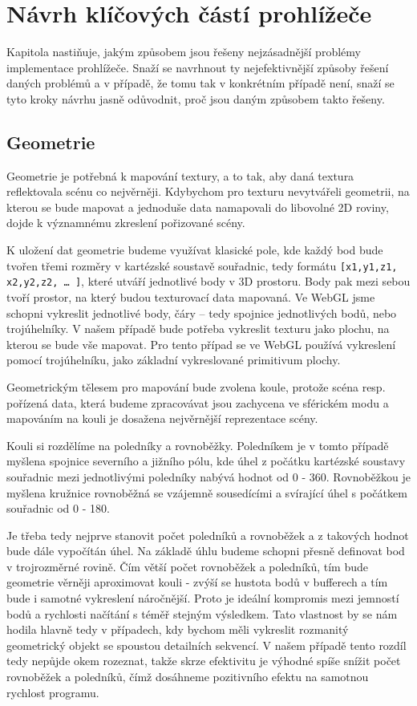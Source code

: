  



\newpage

\chapter{Návrh klíčových částí prohlížeče}
\label{chapter:3}
Kapitola nastiňuje, jakým způsobem jsou řešeny nejzásadnější problémy implementace prohlížeče. Snaží se navrhnout ty nejefektivnější způsoby řešení daných problémů a v případě, že tomu tak v konkrétním případě není, snaží se tyto  kroky návrhu jasně odůvodnit, proč jsou  daným způsobem takto řešeny.


\section{Geometrie}
Geometrie je potřebná k mapování textury, a to tak, aby daná textura reflektovala scénu co nejvěrněji. Kdybychom pro texturu nevytvářeli geometrii, na kterou se bude mapovat a jednoduše data namapovali do libovolné 2D roviny, dojde k významnému zkreslení pořizované scény.

K uložení dat geometrie budeme využívat klasické pole, kde každý bod bude tvořen třemi rozměry v kartézské soustavě souřadnic, tedy formátu \texttt{[x1,y1,z1, x2,y2,z2, … ]}, které utváří jednotlivé body v 3D prostoru. Body pak mezi sebou tvoří prostor, na který budou texturovací data  mapovaná. Ve WebGL jsme schopni vykreslit jednotlivé body, čáry – tedy spojnice jednotlivých bodů, nebo trojúhelníky. V našem případě bude potřeba vykreslit texturu jako plochu, na kterou se bude vše mapovat. Pro tento případ se ve WebGL používá vykreslení pomocí trojúhelníku, jako základní vykreslované primitivum plochy.

Geometrickým tělesem pro mapování bude zvolena koule, protože scéna resp. pořízená data, která budeme zpracovávat jsou zachycena ve sférickém modu a mapováním na kouli je dosažena nejvěrnější reprezentace scény.

Kouli si rozdělíme na poledníky a rovnoběžky. Poledníkem je v tomto případě myšlena spojnice severního a jižního pólu, kde úhel z počátku kartézské soustavy souřadnic mezi jednotlivými poledníky nabývá hodnot od 0 - 360\degree. Rovnoběžkou je myšlena kružnice  rovnoběžná se vzájemně sousedícími a svírající úhel s počátkem souřadnic od 0 - 180\degree. 

Je třeba tedy nejprve stanovit počet poledníků a rovnoběžek a z takových hodnot bude dále vypočítán úhel. Na základě úhlu budeme schopni přesně definovat bod v trojrozměrné rovině. Čím větší počet rovnoběžek a poledníků, tím bude geometrie věrněji aproximovat kouli - zvýší se hustota bodů v bufferech a tím bude i samotné vykreslení náročnější. Proto je ideální kompromis mezi jemností bodů a rychlosti načítání s téměř stejným výsledkem. Tato vlastnost by se nám hodila hlavně tedy v případech, kdy bychom měli vykreslit rozmanitý geometrický objekt se spoustou detailních sekvencí. V našem případě tento rozdíl tedy nepůjde okem rozeznat, takže skrze efektivitu je výhodné spíše snížit počet rovnoběžek a poledníků, čímž dosáhneme pozitivního efektu na samotnou rychlost programu.


